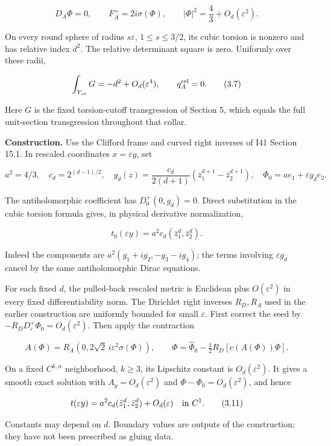 \documentclass[
  10pt,
]{article}
\begin{document}
\[
 D_A\Phi=0,\qquad F_A^+=2i\sigma(\Phi),\qquad
 |\Phi|^2=\frac43+O_d(\varepsilon^2).
 \tag{3.6}
\]

On every round sphere of radius \(s\varepsilon\), \(1\le s\le3/2\), its
cubic torsion is nonzero and has relative index \(d^2\). The relative
determinant square is zero. Uniformly over these radii,

\[
 \int_{Y_{s\varepsilon}}G=-d^2+O_d(\varepsilon^4),
 \qquad q_A^{\rm rel}=0.
 \tag{3.7}
\]

Here \(G\) is the fixed torsion-cutoff transgression of Section 5, which
equals the full unit-section transgression throughout that collar.

\textbf{Construction.} Use the Clifford frame and curved right inverses
of I41 Section 15.1. In rescaled coordinates \(x=\varepsilon y\), set

\[
 a^2=4/3,\quad c_d=2^{(d-1)/2},\quad
 g_d(z)=\frac{c_d}{2(d+1)}
              (\bar z_1^{d+1}-\bar z_2^{d+1}),\quad
 \Phi_0=a e_1+\varepsilon g_d e_2.
 \tag{3.8}
\]

The antiholomorphic coefficient has \(D_0^+(0,g_d)=0\). Direct
substitution in the cubic torsion formula gives, in physical derivative
normalization,

\[
 t_0(\varepsilon y)=a^2c_d(\bar z_1^d,\bar z_2^d).
 \tag{3.9}
\]

Indeed the components are \(a^2(g_1+ig_2,-g_3-ig_4)\); the terms
involving \(\varepsilon g_d\) cancel by the same antiholomorphic Dirac
equations.

For each fixed \(d\), the pulled-back rescaled metric is Euclidean plus
\(O(\varepsilon^2)\) in every fixed differentiability norm. The
Dirichlet right inverses \(R_D,R_A\) used in the earlier construction
are uniformly bounded for small \(\varepsilon\). First correct the seed
by \(-R_DD_\varepsilon^+\Phi_0=O_d(\varepsilon^2)\). Then apply the
contraction

\[
 A(\Phi)=R_A(0,2\sqrt2\,i\varepsilon^2\sigma(\Phi)),\qquad
 \Phi=\widehat\Phi_0-\tfrac12R_D[c(A(\Phi))\Phi].
 \tag{3.10}
\]

On a fixed \(C^{k,\alpha}\) neighborhood, \(k\ge3\), its Lipschitz
constant is \(O_d(\varepsilon^2)\). It gives a smooth exact solution
with \(A_y=O_d(\varepsilon^2)\) and \(\Phi-\Phi_0=O_d(\varepsilon^2)\),
and hence

\[
 t(\varepsilon y)=a^2c_d(\bar z_1^d,\bar z_2^d)+O_d(\varepsilon)
                                                \quad\hbox{in }C^1.
 \tag{3.11}
\]

Constants may depend on \(d\). Boundary values are outputs of the
construction; they have not been prescribed as gluing data.
\end{document}
